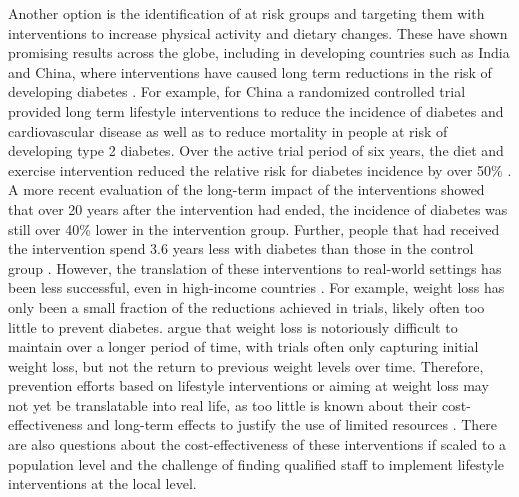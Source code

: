 Another option is the identification of at risk groups and targeting them with interventions to increase physical activity and dietary changes. These have shown promising results across the globe, including in developing countries such as India and China, where interventions have caused long term reductions in the risk of developing diabetes \parencite{Cefalu2016}. For example, for China a randomized controlled trial provided long term lifestyle interventions to reduce the incidence of diabetes and cardiovascular disease as well as to reduce mortality in people at risk of developing type 2 diabetes. Over the active trial period of six years, the diet and exercise intervention reduced the relative risk for diabetes incidence by  over 50\% \parencite{Pan1997}. A more recent evaluation of the long-term impact of the interventions showed that over 20 years after the intervention had ended, the incidence of diabetes was still over 40\% lower in the intervention group. Further, people that had received the intervention spend 3.6 years less with diabetes than those in the control group \parencite{Li2008}. However, the translation of these interventions to real-world settings has been less successful, even in high-income countries \parencite{Wareham2016, Kahn2014}. For example, weight loss has only been a small fraction of the reductions achieved in trials, likely often too little to prevent diabetes. \textcite{Kahn2014} argue that weight loss is notoriously difficult to maintain over a longer period of time, with trials often only capturing initial weight loss, but not the return to previous weight levels over time.  Therefore, prevention efforts based on lifestyle interventions or aiming at weight loss may not yet be translatable into real life, as too little is known about their cost-effectiveness and long-term effects to justify the use of limited resources \parencite{Kahn2014}. There are also questions about the cost-effectiveness of these interventions if scaled to a population level and the challenge of finding qualified staff to implement lifestyle interventions at the local level. 

